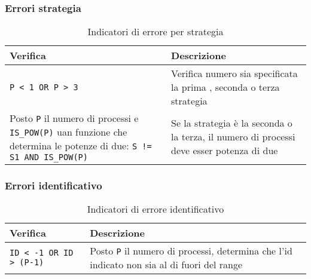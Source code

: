 \documentclass[a4paper,11pt]{book}
\begin{document}
\subsubsection{Errori strategia}
\begin{table}[H]
    \begin{tabular}{| p{} | p{} |}
        \hline
        \rowcolor{header}
        \textbf{Verifica} & \textbf{Descrizione} \\
        \hline
        \verb|P < 1 OR P > 3| & 
        Verifica numero sia specificata la prima , seconda o terza strategia \\
        \hline
        Posto \verb|P| il numero di processi e \verb|IS_POW(P)| uan funzione che determina le potenze di due: \verb|S != S1 AND IS_POW(P)| & 
        Se la strategia è la seconda o la terza, il numero di processi deve esser potenza di due \\
        \hline
    \end{tabular}
    \caption{Indicatori di errore per strategia}
    \label{tab:Indicatori di errore per strategia}
\end{table}

\subsubsection{Errori identificativo}
\begin{table}[H]
    \begin{tabular}{| p{} | p{} |}
        \hline
        \rowcolor{header}
        \textbf{Verifica} & \textbf{Descrizione} \\
        \hline
        \verb|ID < -1 OR ID > (P-1)| & 
        Posto \verb|P| il numero di processi, determina che l'id indicato non sia al di fuori del range\\
        \hline
    \end{tabular}
    \caption{Indicatori di errore identificativo}
    \label{tab:Indicatori di errore identificativo}
\end{table}
\end{document}
